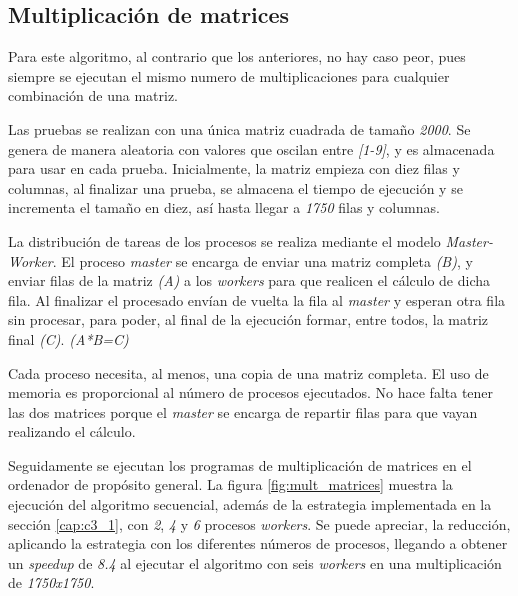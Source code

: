 		

	\subsection{Multiplicación de matrices}
		
		Para este algoritmo, al contrario que los anteriores, no hay caso peor, pues siempre se ejecutan el mismo numero de multiplicaciones para cualquier combinación de una matriz. 
		
		Las pruebas se realizan con una única matriz cuadrada de tamaño \textit{2000}. Se genera de manera aleatoria con valores que oscilan entre \textit{[1-9]}, y es almacenada para usar en cada prueba. Inicialmente, la matriz empieza con diez filas y columnas, al finalizar una prueba, se almacena el tiempo de ejecución y se incrementa el tamaño en diez, así hasta llegar a \textit{1750} filas y columnas. 
		
		La distribución de tareas de los procesos se realiza mediante el modelo \textit{Master-Worker}. El proceso \textit{master} se encarga de enviar una matriz completa \textit{(B)}, y enviar filas de la matriz \textit{(A)} a los \textit{workers} para que realicen el cálculo de dicha fila. Al finalizar el procesado envían de vuelta la fila al \textit{master} y esperan otra fila sin procesar, para poder, al final de la ejecución formar, entre todos, la matriz final \textit{(C)}. \textit{(A*B=C)}
	
		Cada proceso necesita, al menos, una copia de una matriz completa. El uso de memoria es proporcional al número de procesos ejecutados. No hace falta tener las dos matrices porque el \textit{master} se encarga de repartir filas para que vayan realizando el cálculo.
		
		\vspace*{0.2cm}
	
		Seguidamente se ejecutan los programas de multiplicación de matrices en el ordenador de propósito general. La figura \ref{fig:mult_matrices} muestra la ejecución del algoritmo secuencial, además de la estrategia implementada en la sección \ref{cap:c3_1}, con \textit{2}, \textit{4} y \textit{6} procesos \textit{workers}. Se puede apreciar, la reducción, aplicando la estrategia con los diferentes números de procesos, llegando a obtener un \textit{speedup} de \textit{8.4} al ejecutar el algoritmo con seis \textit{workers} en una multiplicación de \textit{1750x1750}.
		
